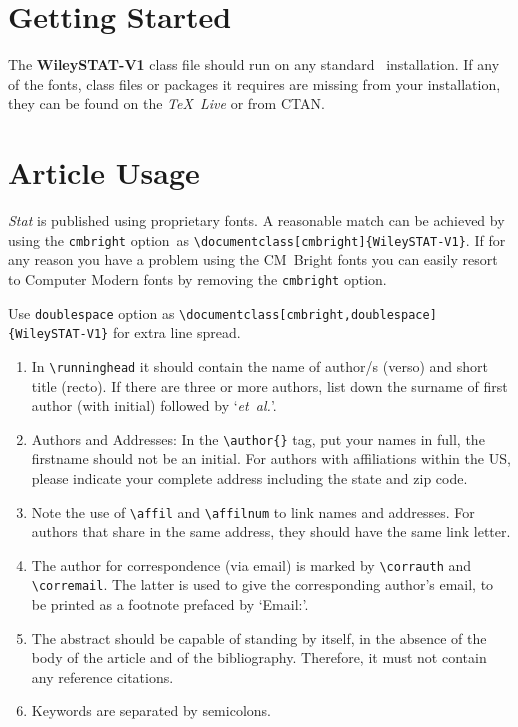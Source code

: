 \documentclass[cmbright]{WileySTAT-V1} %
\theoremstyle{plain}
\begin{document}
\section{Getting Started}\label{sec2}

The \textbf{WileySTAT-V1} class file should run on any standard \LaTeXe\ installation. If any of the fonts, class files or packages it requires are missing from your installation, they can be found on the \emph{\TeX\ Live} or from CTAN.

\section{Article Usage}\label{sec3}

\textit{Stat} is published using proprietary fonts. A reasonable match can be achieved by using the \verb"cmbright" option~as \verb"\documentclass[cmbright]{WileySTAT-V1}". If for any reason you have a problem using the CM~Bright fonts you can easily resort to Computer Modern fonts by removing the \verb"cmbright" option.

Use \verb"doublespace" option as \verb"\documentclass[cmbright,doublespace]{WileySTAT-V1}" for extra line spread.

\begin{enumerate}
\item[(i)] In \verb"\runninghead" it should contain the name of author/s (verso) and short title (recto). If there are three or more authors, list down the surname of first author (with initial) followed by `\emph{et~al.}'.

\item[(ii)] Authors and Addresses: In the \verb"\author{}" tag, put your names in full, the firstname should not be an initial. For authors with affiliations within the US, please indicate your complete address including the state and zip code.

\item[(iii)] Note the use of \verb"\affil" and \verb"\affilnum" to link names and addresses. For authors that share in the same address, they should have the same link letter.

\item[(iv)] The author for correspondence (via email) is marked by \verb"\corrauth" and \verb"\corremail". The latter is used to give the corresponding author's email, to be printed as a footnote prefaced by `Email:'.

\item[(v)] The abstract should be capable of standing by itself, in the absence of the body of the article and of the bibliography. Therefore, it must not contain any reference citations.

\item[(vi)] Keywords are separated by semicolons.
\end{enumerate}
\end{document}
